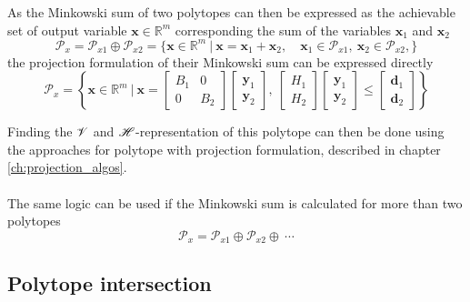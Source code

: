 As the Minkowski sum of two polytopes can then be expressed as the achievable set of output variable $\bm{x}\in\mathbb{R}^m$ corresponding the sum of the variables $\bm{x}_1$ and $\bm{x}_2$
\begin{equation}
    \mathcal{P}_{x}= \mathcal{P}_{x1} \oplus \mathcal{P}_{x2} = \{\bm{x}\in\mathbb{R}^m ~|~ \bm{x} =  \bm{x}_1 + \bm{x}_2, \quad \bm{x}_1 \in \mathcal{P}_{x1}, ~\bm{x}_2 \in \mathcal{P}_{x2},  \}
\end{equation}
the projection formulation of their Minkowski sum can be expressed directly
\begin{equation}
    \mathcal{P}_{x}=\left\{\bm{x}\in\mathbb{R}^m ~\bigg|~ 
    \bm{x} = \begin{bmatrix}
        B_1 & 0 \\
        0 & B_2
    \end{bmatrix}\begin{bmatrix}
        \bm{y}_1 \\
        \bm{y}_2
    \end{bmatrix}, ~\begin{bmatrix}
        H_1  \\
        H_2
    \end{bmatrix} \begin{bmatrix}
        \bm{y}_1 \\
        \bm{y}_2
    \end{bmatrix} \leq \begin{bmatrix}
        \bm{d}_1  \\
        \bm{d}_2
    \end{bmatrix} \right\}
\end{equation}

Finding the $\mathscr{V}$ and $\mathscr{H}$-representation of this polytope can then be done using the approaches  for polytope with projection formulation, described in chapter \ref{ch:projection_algos}.

\paragraph*{} The same logic can be used if the Minkowski sum is calculated for more than two polytopes 
\begin{equation}
    \mathcal{P}_x = \mathcal{P}_{x1} \oplus \mathcal{P}_{x2} \oplus ~\cdots
\end{equation}

\subsection{Polytope intersection}

